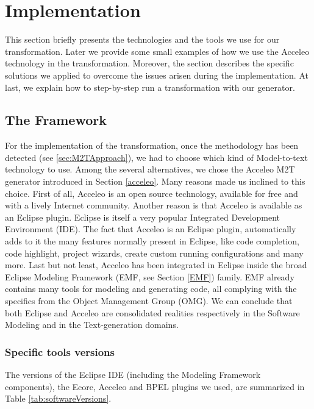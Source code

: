 \section{Implementation} %
\label{sec:TheFramework}
This section briefly presents the technologies and the tools we use for our transformation. Later we provide some small examples of how we use the Acceleo technology in the transformation.
Moreover, the section describes the specific solutions we applied to overcome the issues arisen during the implementation.
At last, we explain how to step-by-step run a transformation with our generator.

\subsection{The Framework}
\label{framework}
For the implementation of the transformation, once the methodology has been detected (see \ref{sec:M2TApproach}), we had to choose which kind of Model-to-text technology to use. Among the several alternatives, we chose the Acceleo M2T generator introduced in Section \ref{acceleo}.
Many reasons made us inclined to this choice. 
First of all, Acceleo is an open source technology, available for free and with a lively Internet community. Another reason is that Acceleo is available as an Eclipse plugin. Eclipse is itself a very popular Integrated Development Environment (IDE). The fact that Acceleo is an Eclipse plugin, automatically adds to it the many features normally present in Eclipse, like code completion, code highlight, project wizards, create custom running configurations and many more. 
Last but not least, Acceleo has been integrated in Eclipse inside the broad Eclipse Modeling Framework (EMF, see Section \ref{EMF}) family. EMF already contains many tools for modeling and generating code, all complying with the specifics from the Object Management Group (OMG).
We can conclude that both Eclipse and Acceleo are consolidated realities respectively in the Software Modeling and in the Text-generation domains. 

\subsubsection{Specific tools versions}
\label{sec:specificTools}
The versions of the Eclipse IDE (including the Modeling Framework components), the Ecore, Acceleo and BPEL plugins we used, are summarized in Table \ref{tab:softwareVersions}.

